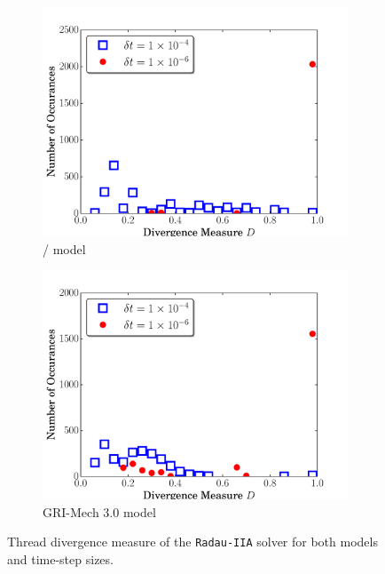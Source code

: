 \documentclass[final,twocolumn]{elsarticle}
\begin{document}
\begin{figure}[htb]
  \ifmeasure
  \fontsize{8pt}{10pt}\selectfont
  \fi
  \centering
  \begin{subfigure}{0.49\textwidth}
      \includegraphics[width=\linewidth]{H2_radau2a_div.pdf}
      \caption{\slash{} model}
  \end{subfigure}
  \begin{subfigure}{0.49\textwidth}
      \includegraphics[width=\linewidth]{CH4_radau2a_div.pdf}
      \caption{GRI-Mech 3.0 model}
      \label{F:Rad_div_gri}
  \end{subfigure}
  \caption{Thread divergence measure of the \texttt{Radau-IIA} solver for both models and time-step sizes.}
  \label{F:rad_divergence}
\end{figure}
\end{document}

